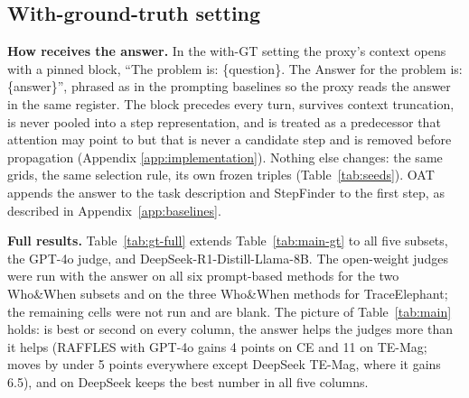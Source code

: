 \subsection{With-ground-truth setting}
\label{app:gt}

\textbf{How \soap{} receives the answer.}
In the with-GT setting the proxy's context opens with a pinned block, ``The problem
is: \{question\}. The Answer for the problem is: \{answer\}'', phrased as in the
prompting baselines so the proxy reads the answer in the same register. The block
precedes every turn, survives context truncation, is never pooled into a step
representation, and is treated as a predecessor that attention may point to but that
is never a candidate step and is removed before propagation (Appendix
\ref{app:implementation}). Nothing else changes: the same grids, the same selection
rule, its own frozen triples (Table~\ref{tab:seeds}). OAT appends the answer to the
task description and StepFinder to the first step, as described in
Appendix~\ref{app:baselines}.

\textbf{Full results.}
Table~\ref{tab:gt-full} extends Table~\ref{tab:main-gt} to all five subsets, the
GPT-4o judge, and DeepSeek-R1-Distill-Llama-8B. The open-weight judges were run with
the answer on all six prompt-based methods for the two Who\&When subsets and on the
three Who\&When methods for TraceElephant; the remaining cells were not run and are
blank. The picture of Table~\ref{tab:main} holds: \soap{} is best or second on every
column, the answer helps the judges more than it helps \soap{} (RAFFLES with GPT-4o
gains 4 points on CE and 11 on TE-Mag; \soap{} moves by under 5 points everywhere
except DeepSeek TE-Mag, where it gains 6.5), and on DeepSeek \soap{} keeps the best
number in all five columns.

